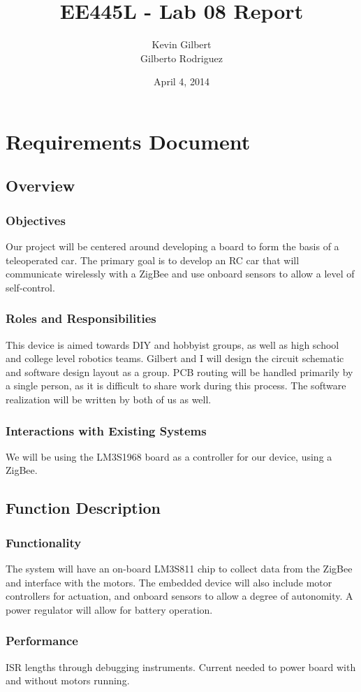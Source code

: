 \documentclass[twoside]{article}
\title{EE445L - Lab 08 Report}
\author{Kevin Gilbert\\ Gilberto Rodriguez}
\date{April 4, 2014}
\begin{document}
\raggedbottom
\maketitle{}

\section{Requirements Document}
\subsection{Overview}
\subsubsection{Objectives}
Our project will be centered around developing a board to form the basis of a teleoperated car. The primary goal is to develop an RC car that will communicate wirelessly with a ZigBee and use onboard sensors to allow a level of self-control.
\subsubsection{Roles and Responsibilities}
This device is aimed towards DIY and hobbyist groups, as well as high school and college level robotics teams. Gilbert and I will design the circuit schematic and software design layout as a group. PCB routing will be handled primarily by a single person, as it is difficult to share work during this process. The software realization will be written by both of us as well.
\subsubsection{Interactions with Existing Systems}
We will be using the LM3S1968 board as a controller for our device, using a ZigBee.
\subsection{Function Description}
\subsubsection{Functionality}
The system will have an on-board LM3S811 chip to collect data from the ZigBee and interface with the motors. The embedded device will also include motor controllers for actuation, and onboard sensors to allow a degree of autonomity. A power regulator will allow for battery operation.
\subsubsection{Performance}
ISR lengths through debugging instruments. Current needed to power board with and without motors running.
\end{document}
